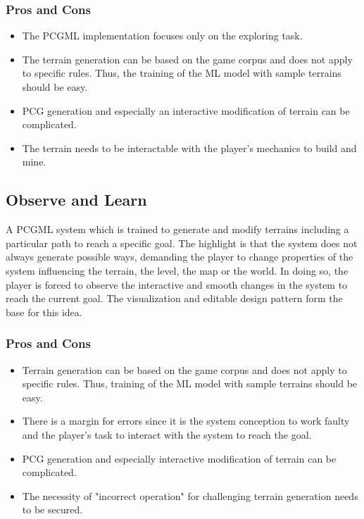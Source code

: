 \documentclass[MGS,Master,english]{twbook}%
\begin{document}
\subsubsection{Pros and Cons}
\begin{itemize}
	\item The \ac{PCGML} implementation focuses only on the exploring task.
	\item The terrain generation can be based on the game corpus and does not apply to specific rules. Thus, the training of the \ac{ML} model with sample terrains should be easy.
	\item \ac{PCG} generation and especially an interactive modification of terrain can be complicated.
	\item The terrain needs to be interactable with the player's mechanics to build and mine.
\end{itemize}


\subsection{Observe and Learn} \label{idea::observeAndLearn}
A \ac{PCGML} system which is trained to generate and modify terrains including a particular path to reach a specific goal. The highlight is that the system does not always generate possible ways, demanding the player to change properties of the system influencing the terrain, the level, the map or the world. In doing so, the player is forced to observe the interactive and smooth changes in the system to reach the current goal. The visualization and editable design pattern form the base for this idea.

\subsubsection{Pros and Cons}
\begin{itemize}
	\item Terrain generation can be based on the game corpus and does not apply to specific rules. Thus, training of the \ac{ML} model with sample terrains should be easy.
	\item There is a margin for errors since it is the system conception to work faulty and the player's task to interact with the system to reach the goal. 
	\item \ac{PCG} generation and especially interactive modification of terrain can be complicated.
	\item The necessity of "incorrect operation" for challenging terrain generation needs to be secured.
\end{itemize}
\end{document}
